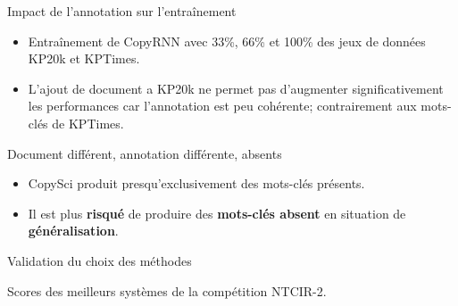 \begin{frame}{Impact de l'annotation sur l'entraînement}
    
    
    \begin{itemize}
        \item Entraînement de CopyRNN avec 33\%, 66\% et 100\% des jeux de données KP20k et KPTimes.
        \item L'ajout de document a KP20k ne permet pas d'augmenter significativement les performances car l'annotation est peu cohérente; contrairement aux mots-clés de KPTimes.
    \end{itemize}
\end{frame}



\begin{frame}{Document différent, annotation différente, absents}
    
    \begin{itemize}
        \item \colorbox{color1!40}{CopySci} produit presqu'exclusivement des mots-clés présents.
        \item Il est plus \textbf{risqué} de produire des \textbf{mots-clés absent} en situation de \textbf{généralisation}.
    \end{itemize}
\end{frame}


\begin{frame}{Validation du choix des méthodes}
    
    \begin{table}[!ht]
    \centering
    
    \vspace{.5cm}
    Scores des meilleurs systèmes de la compétition NTCIR-2.
\end{table}

\end{frame}

